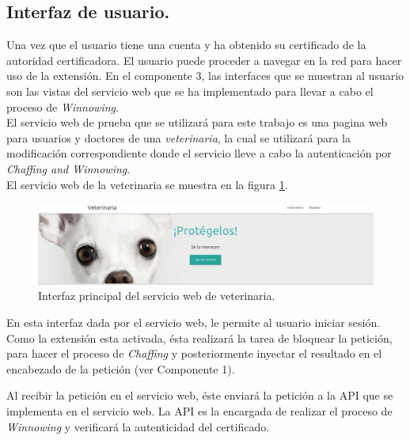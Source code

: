 \documentclass[12pt, a4paper, titlepage]{report}
\begin{document}
            \subsection{Interfaz de usuario.}
                Una vez que el usuario tiene una cuenta y ha obtenido su certificado de la autoridad certificadora. El usuario puede proceder a navegar en la red para hacer uso de la extensión. En el componente 3, las interfaces que se muestran al usuario son las vistas del servicio web que se ha implementado para llevar a cabo el proceso de \textit{Winnowing}. \\
                El servicio web de prueba que se utilizará para este trabajo es una pagina web para usuarios y doctores de una \textit{veterinaria}, la cual se utilizará para la modificación correspondiente donde el servicio lleve a cabo la autenticación por \textit{Chaffing and Winnowing}.\\
        		El servicio web de la veterinaria se muestra en la figura \ref{fig:UI_homeServicioWeb}.
    		
        		\begin{figure}[H]
    				\begin{center}	\includegraphics[width=12cm]{./imagenes/Disenio/Componente_1/UI_homeServicioWeb.PNG}
    					\caption[Mensaje de éxito]{Interfaz principal del servicio web de veterinaria.}
    				\label{fig:UI_homeServicioWeb}
    				\end{center}
    			\end{figure}
			
    			En esta interfaz dada por el servicio web, le permite al usuario iniciar sesión. Como la extensión esta activada, ésta realizará la tarea de bloquear la petición, para hacer el proceso de \textit{Chaffing} y posteriormente inyectar el resultado en el encabezado de la petición (ver Componente 1).
        	        
    	        Al recibir la petición en el servicio web, éste enviará la petición a la API que se implementa en el servicio web. La API es la encargada de realizar el proceso de \textit{Winnowing} y verificará la autenticidad del certificado.\\
    	        
\end{document}

